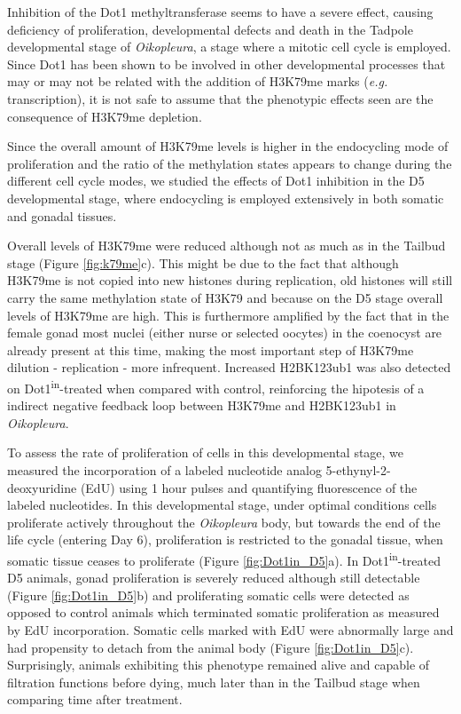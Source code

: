 \documentclass[11pt,twoside,a4paper]{report}
\begin{document}
	Inhibition of the Dot1 methyltransferase seems to have a severe effect, causing deficiency of proliferation, developmental defects and death in the Tadpole developmental stage of \textit{Oikopleura}, a stage where a mitotic cell cycle is employed. Since Dot1 has been shown to be involved in other developmental processes that may or may not be related with the addition of H3K79me marks (\textit{e.g.} transcription), it is not safe to assume that the phenotypic effects seen are the consequence of H3K79me depletion.
	
	Since the overall amount of H3K79me levels is higher in the endocycling mode of proliferation and the ratio of the methylation states appears to change during the different cell cycle modes, we studied the effects of Dot1 inhibition in the D5 developmental stage, where endocycling is employed extensively in both somatic and gonadal tissues.
	
	Overall levels of H3K79me were reduced although not as much as in the Tailbud stage (Figure \ref{fig:k79me}c). This might be due to the fact that although H3K79me is not copied into new histones during replication, old histones will still carry the same methylation state of H3K79 and because on the D5 stage overall levels of H3K79me are high. This is furthermore amplified by the fact that in the female gonad most nuclei (either nurse or selected oocytes) in the coenocyst are already present at this time, making the most important step of H3K79me dilution - replication - more infrequent. Increased H2BK123ub1 was also detected on Dot1\textsuperscript{in}-treated when compared with control, reinforcing the hipotesis of a indirect negative feedback loop between H3K79me and H2BK123ub1 in \textit{Oikopleura}.
	
	To assess the rate of proliferation of cells in this developmental stage, we measured the incorporation of a labeled nucleotide analog 5-ethynyl-2-deoxyuridine (EdU) using 1 hour pulses and quantifying fluorescence of the labeled nucleotides. In this developmental stage, under optimal conditions cells proliferate actively throughout the \textit{Oikopleura} body, but towards the end of the life cycle (entering Day 6), proliferation is restricted to the gonadal tissue, when somatic tissue ceases to proliferate (Figure \ref{fig:Dot1in_D5}a). In Dot1\textsuperscript{in}-treated D5 animals, gonad proliferation is severely reduced although still detectable (Figure \ref{fig:Dot1in_D5}b) and proliferating somatic cells were detected as opposed to control animals which terminated somatic proliferation as measured by EdU incorporation. Somatic cells marked with EdU were abnormally large and had propensity to detach from the animal body (Figure \ref{fig:Dot1in_D5}c). Surprisingly, animals exhibiting this phenotype remained alive and capable of filtration functions before dying, much later than in the Tailbud stage when comparing time after treatment.
	
\end{document}
